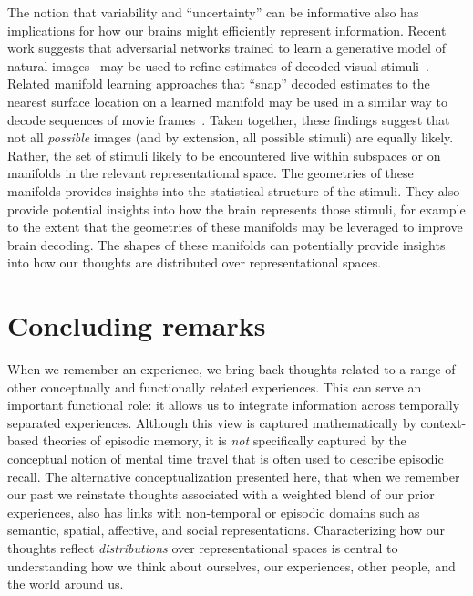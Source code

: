 \documentclass{article}
\begin{document}
The notion that variability and ``uncertainty'' can be informative also has implications for how our brains might efficiently represent information.  Recent work suggests that adversarial networks trained to learn a generative model of natural images~\citep[e.g., ][]{GatyEtal16, IsolEtal17} may be used to refine estimates of decoded visual stimuli~\citep{StYvNase18}. Related manifold learning approaches that ``snap'' decoded estimates to the nearest surface location on a learned manifold may be used in a similar way to decode sequences of movie frames~\citep{HeusEtal18a}.  Taken together, these findings suggest that not all \textit{possible} images (and by extension, all possible stimuli) are equally likely.  Rather, the set of stimuli likely to be encountered live within subspaces or on manifolds in the relevant representational space.  The geometries of these manifolds provides insights into the statistical structure of the stimuli.  They also provide potential insights into how the brain represents those stimuli, for example to the extent that the geometries of these manifolds may be leveraged to improve brain decoding.  The shapes of these manifolds can potentially provide insights into how our thoughts are distributed over representational spaces.

\section*{Concluding remarks}
When we remember an experience, we bring back thoughts related to a range of other conceptually and functionally related experiences.  This can serve an important functional role: it allows us to integrate information across temporally separated experiences.  Although this view is captured mathematically by context-based theories of episodic memory, it is \textit{not} specifically captured by the conceptual notion of mental time travel that is often used to describe episodic recall.  The alternative conceptualization presented here, that when we remember our past we reinstate thoughts associated with a weighted blend of our prior experiences, also has links with non-temporal or episodic domains such as semantic, spatial, affective, and social representations.  Characterizing how our thoughts reflect \textit{distributions} over representational spaces is central to understanding how we think about ourselves, our experiences, other people, and the world around us.
\end{document}
